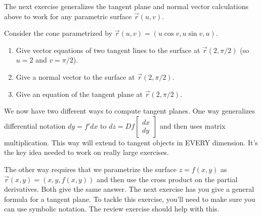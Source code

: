 The next exercise generalizes the tangent plane and normal vector calculations above to work for any parametric surface $\vec r(u,v)$.
\begin{challenge}
%

%
 Consider the cone parametrized by $\vec r(u,v)=(u\cos v, u\sin v,u)$.
 \begin{enumerate}
 \item Give vector equations of two tangent lines to the surface at $\vec r(2,\pi/2)$ (so $u=2$ and $v=\pi/2$).
 \item Give a normal vector to the surface at $\vec r(2,\pi/2)$.
 \item Give an equation of the tangent plane at $\vec r(2,\pi/2)$.
 \end{enumerate}
\end{challenge}


\indent We now have two different ways to compute tangent planes.  One way generalizes differential notation $dy=f'dx$ to 
$dz = Df \begin{bmatrix}dx\\dy\end{bmatrix}$ and then uses matrix multiplication. This way will extend to tangent objects in EVERY dimension.  It's the key idea needed to work on really large exercises.  

\indent The other way requires that we parametrize the surface $z=f(x,y)$ as $\vec r(x,y)=(x,y,f(x,y))$ and then use the cross product on the partial derivatives. Both give the same answer. The next exercise has you give a general formula for a tangent plane.  To tackle this exercise, you'll need to make sure you can use symbolic notation.  The review exercise should help with this.

